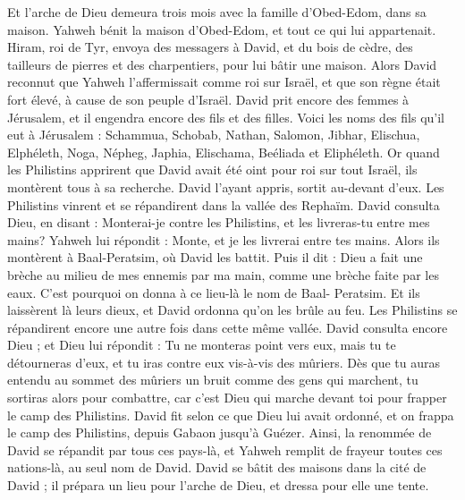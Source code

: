 \begin{multicols}{2}
Et l’arche de Dieu demeura trois mois avec la famille d'Obed-Edom, dans sa maison. Yahweh bénit la maison d'Obed-Edom, et tout ce qui lui appartenait.
\VerseOne{}Hiram, roi de Tyr, envoya des messagers à David, et du bois de cèdre, des tailleurs de pierres et des charpentiers, pour lui bâtir une maison.
Alors David reconnut que Yahweh l'affermissait comme roi sur Israël, et que son règne était fort élevé, à cause de son peuple d'Israël.
David prit encore des femmes à Jérusalem, et il engendra encore des fils et des filles.
Voici les noms des fils qu'il eut à Jérusalem : Schammua, Schobab, Nathan, Salomon,
Jibhar, Elischua, Elphéleth,
Noga, Népheg, Japhia,
Elischama, Beéliada et Eliphéleth.
Or quand les Philistins apprirent que David avait été oint pour roi sur tout Israël, ils montèrent tous à sa recherche. David l'ayant appris, sortit au-devant d'eux.
Les Philistins vinrent et se répandirent dans la vallée des Rephaïm.
David consulta Dieu, en disant : Monterai-je contre les Philistins, et les livreras-tu entre mes mains? Yahweh lui répondit : Monte, et je les livrerai entre tes mains.
Alors ils montèrent à Baal-Peratsim, où David les battit. Puis il dit : Dieu a fait une brèche au milieu de mes ennemis par ma main, comme une brèche faite par les eaux. C'est pourquoi on donna à ce lieu-là le nom de Baal- Peratsim.
Et ils laissèrent là leurs dieux, et David ordonna qu'on les brûle au feu.
Les Philistins se répandirent encore une autre fois dans cette même vallée.
David consulta encore Dieu ; et Dieu lui répondit : Tu ne monteras point vers eux, mais tu te détourneras d'eux, et tu iras contre eux vis-à-vis des mûriers.
Dès que tu auras entendu au sommet des mûriers un bruit comme des gens qui marchent, tu sortiras alors pour combattre, car c’est Dieu qui marche devant toi pour frapper le camp des Philistins.
David fit selon ce que Dieu lui avait ordonné, et on frappa le camp des Philistins, depuis Gabaon jusqu'à Guézer.
Ainsi, la renommée de David se répandit par tous ces pays-là, et Yahweh remplit de frayeur toutes ces nations-là, au seul nom de David.
\VerseOne{}David se bâtit des maisons dans la cité de David ; il prépara un lieu pour l’arche de Dieu, et dressa pour elle une tente.

\end{multicols}
